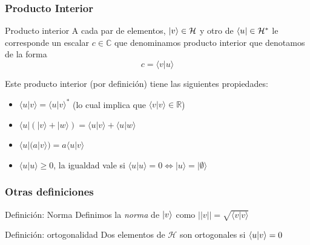\documentclass{beamer}
\begin{document}
    \begin{frame}
        \frametitle{Producto Interior}
        \begin{block}{Producto interior}
        A cada par de elementos, $| v \rangle\in\mathcal{H}$ y otro de $\langle u |\in\mathcal{H}^*$ le corresponde un escalar $c\in\mathbb{C}$ que denominamos producto interior que denotamos de la forma
        \[ c=\langle v|u\rangle \]
    
        Este producto interior (por definición) tiene las siguientes propiedades:
        \begin{itemize}
            \item $\langle u|v\rangle=\langle u|v\rangle^*$ (lo cual implica que $\langle v|v\rangle\in\mathbb{R}$)
            \item $\langle u|(|v\rangle+|w\rangle)=\langle u|v\rangle+\langle u|w\rangle$
            \item $\langle u|(a|v\rangle)=a\langle u|v \rangle$
            \item $\langle u|u\rangle\geq 0$, la igualdad vale si $\langle u|u\rangle=0 \Leftrightarrow |u\rangle=|\emptyset\rangle$
        \end{itemize}
        \end{block}
    
    
    \end{frame}
    
    \begin{frame}
        \frametitle{Otras definiciones}
        \begin{block}{Definición: Norma}
            Definimos la {\em norma} de $| v \rangle$ como $||v||=\sqrt{\langle v|v\rangle}$
        \end{block}
        \begin{block}{Definición: ortogonalidad}
            Dos elementos de $\mathcal{H}$ son ortogonales si $\langle u | v \rangle=0$
        \end{block}
    \end{frame}
    
\end{document}
